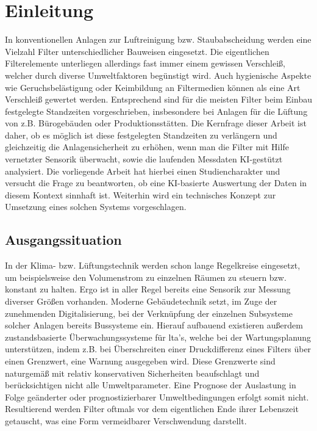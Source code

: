 \chapter{Einleitung}
\label{ch: Einleitung}
In konventionellen Anlagen zur Luftreinigung bzw. Staubabscheidung werden eine Vielzahl Filter unterschiedlicher Bauweisen eingesetzt. Die eigentlichen Filterelemente unterliegen allerdings fast immer einem gewissen Verschleiß, welcher durch diverse Umweltfaktoren begünstigt wird. Auch hygienische Aspekte wie Geruchsbelästigung oder Keimbildung an Filtermedien können als eine Art Verschleiß gewertet werden. Entsprechend sind für die meisten Filter beim Einbau festgelegte Standzeiten vorgeschrieben, insbesondere bei Anlagen für die Lüftung von z.B. Bürogebäuden oder Produktionsstätten. Die Kernfrage dieser Arbeit ist daher, ob es möglich ist diese festgelegten Standzeiten zu verlängern und gleichzeitig die Anlagensicherheit zu erhöhen, wenn man die Filter mit Hilfe vernetzter Sensorik überwacht, sowie die laufenden Messdaten KI-gestützt analysiert. Die vorliegende Arbeit hat hierbei einen Studiencharakter und versucht die Frage zu beantworten, ob eine KI-basierte Auswertung der Daten in diesem Kontext sinnhaft ist. Weiterhin wird ein technisches Konzept zur Umsetzung eines solchen Systems vorgeschlagen.  
    \section{Ausgangssituation}
    In der Klima- bzw. Lüftungstechnik werden schon lange Regelkreise eingesetzt, um beispielsweise den Volumenstrom zu einzelnen Räumen zu steuern bzw. konstant zu halten. Ergo ist in aller Regel bereits eine Sensorik zur Messung diverser Größen vorhanden. Moderne Gebäudetechnik setzt, im Zuge der zunehmenden Digitalisierung, bei der Verknüpfung der einzelnen Subsysteme solcher Anlagen bereits Bussysteme ein. Hierauf aufbauend existieren außerdem zustandsbasierte Überwachungssysteme für \ac{lta}'s, welche bei der Wartungsplanung unterstützen, indem z.B. bei Überschreiten einer Druckdifferenz eines Filters über einen Grenzwert, eine Warnung ausgegeben wird. Diese Grenzwerte sind naturgemäß mit relativ konservativen Sicherheiten beaufschlagt und berücksichtigen nicht alle Umweltparameter. Eine Prognose der Auslastung in Folge geänderter oder prognostizierbarer Umweltbedingungen erfolgt somit nicht. Resultierend werden Filter oftmals vor dem eigentlichen Ende ihrer Lebenszeit getauscht, was eine Form vermeidbarer Verschwendung darstellt.
